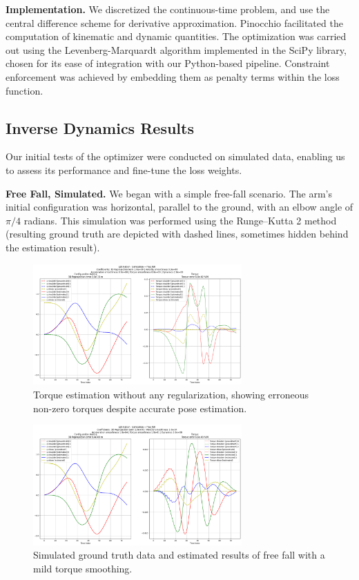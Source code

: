 \noindent\textbf{Implementation.} We discretized the continuous-time problem, 
and use the central difference scheme for derivative approximation. 
Pinocchio facilitated the computation of kinematic and dynamic quantities. 
The optimization was carried out using the Levenberg-Marquardt algorithm implemented in the SciPy library, 
chosen for its ease of integration with our Python-based pipeline. 
Constraint enforcement was achieved by embedding them as penalty terms within the loss function.

\subsection{Inverse Dynamics Results}
\label{subsec:dynamic_results}

Our initial tests of the optimizer were conducted on simulated data, enabling us to assess its performance and fine-tune the loss weights.

\noindent\textbf{Free Fall, Simulated.} We began with a simple free-fall scenario. The arm's initial configuration was horizontal, parallel to the ground, with an elbow angle of 
\(\pi/4\) radians. This simulation was performed using the Runge–Kutta 2 method (resulting ground truth are depicted with dashed lines, sometimes hidden
behind the estimation result).
\begin{figure}
    \centering
    \includegraphics[width=8cm]{figures/inverse_dynamics_free_fall_case_no_smoothing.png}
    \caption{Torque estimation without any regularization, showing erroneous non-zero torques despite accurate pose estimation.}
    \label{fig:free_fall_torque_no_smoothing}
\end{figure}


\begin{figure}
    \centering
    \includegraphics[width=8cm]{figures/inverse_dynamics_free_fall_case_torque_smooth_e-1.png}
    \caption{Simulated ground truth data and estimated results of free fall with a mild torque smoothing.}
    \label{fig:free_fall_torque_smoothing}
\end{figure}

